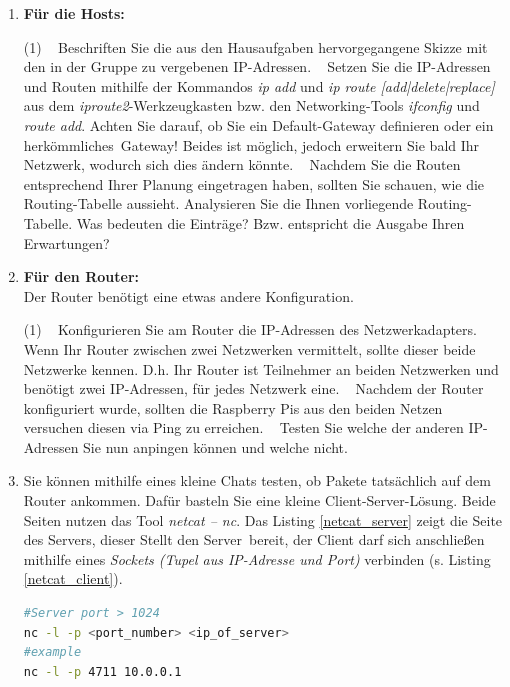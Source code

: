 \documentclass[paper=a4,fontsize=11pt]{scrartcl}%
\numberwithin{equation}{section}
\begin{document}
\begin{enumerate}
	\item \textbf{Für die Hosts:}\\
	\begin{tasks}(1)
		\task~ Beschriften Sie die aus den Hausaufgaben hervorgegangene Skizze mit den in der Gruppe zu vergebenen IP-Adressen.
		\task~ Setzen Sie die IP-Adressen und Routen mithilfe der Kommandos \emph{ip add} und \emph{ip route [add|delete|replace]} aus dem \emph{iproute2}-Werkzeugkasten bzw. den Networking-Tools \emph{ifconfig} und \emph{route add}.  Achten Sie darauf, ob Sie ein Default-Gateway definieren oder ein \glqq herkömmliches\grqq\ Gateway! Beides ist möglich, jedoch erweitern Sie bald Ihr Netzwerk, wodurch sich dies ändern könnte.
		\task~ Nachdem Sie die Routen entsprechend Ihrer Planung eingetragen haben, sollten Sie schauen, wie die Routing-Tabelle aussieht. Analysieren Sie die Ihnen vorliegende Routing-Tabelle. Was bedeuten die Einträge? Bzw. entspricht die Ausgabe Ihren Erwartungen?
	\end{tasks}
	\item \textbf{Für den Router:}\\
	Der Router benötigt eine etwas andere Konfiguration. 
	\begin{tasks}(1)
		\task~ Konfigurieren Sie am Router die IP-Adressen des Netzwerkadapters. Wenn Ihr Router zwischen zwei Netzwerken vermittelt, sollte dieser beide Netzwerke kennen. D.h. Ihr Router ist Teilnehmer an beiden Netzwerken und benötigt zwei IP-Adressen, für jedes Netzwerk eine.
		\task~ Nachdem der Router konfiguriert wurde, sollten die Raspberry Pis aus den beiden Netzen versuchen diesen via Ping zu erreichen.
		\task~ Testen Sie welche der anderen IP-Adressen Sie nun anpingen können und welche nicht.
		\end{tasks}
		\item Sie können mithilfe eines kleine Chats testen, ob Pakete tatsächlich auf dem Router ankommen. Dafür basteln Sie eine kleine  Client-Server-Lösung. Beide Seiten nutzen das Tool \emph{netcat -- nc}. Das Listing \ref{netcat_server} zeigt die Seite des Servers, dieser Stellt den \glqq Server\grqq\ bereit, der Client darf sich anschließen mithilfe eines \emph{Sockets (Tupel aus IP-Adresse und Port)} verbinden (s. Listing \ref{netcat_client}). 
		
	\begin{lstlisting}[style=Bash, language=Bash, label={netcat_server}]
#Server port > 1024 
nc -l -p <port_number> <ip_of_server>
#example
nc -l -p 4711 10.0.0.1
		\end{lstlisting}
		

\end{enumerate}
\end{document}
